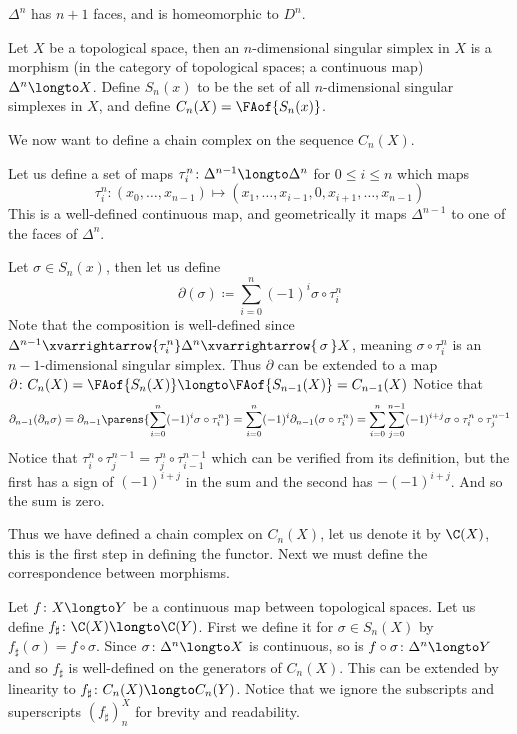 \edefn

$\Delta^n$ has $n+1$ faces, and is homeomorphic to $D^n$.

\bdefn

    Let $X$ be a topological space, then an {\emphcolor $n$-dimensional singular simplex} in $X$ is a morphism (in the category of topological spaces; a continuous map) $\Delta^n\longto X$.
    Define $S_n(x)$ to be the set of all $n$-dimensional singular simplexes in $X$, and define $C_n(X)=\FAof{S_n(x)}$.

\edefn

We now want to define a chain complex on the sequence $C_n(X)$.

Let us define a set of maps $\tau_i^n\colon\Delta^{n-1}\longto\Delta^n$ for $0\leq i\leq n$ which maps
$$ \tau_i^n\colon (x_0,\dots,x_{n-1})\mapsto(x_1,\dots,x_{i-1},0,x_{i+1},\dots,x_{n-1}) $$
This is a well-defined continuous map, and geometrically it maps $\Delta^{n-1}$ to one of the faces of $\Delta^n$.

Let $\sigma\in S_n(x)$, then let us define
$$ \partial(\sigma) \coloneqq \sum_{i=0}^n(-1)^i\sigma\circ\tau_i^n $$
Note that the composition is well-defined since $\Delta^{n-1}\xvarrightarrow{\tau_i^n}\Delta^n\xvarrightarrow{\,\sigma\,}X$, meaning $\sigma\circ\tau_i^n$ is an $n-1$-dimensional singular simplex.
Thus $\partial$ can be extended to a map $\partial\colon C_n(X)=\FAof{S_n(X)}\longto\FAof{S_{n-1}(X)}=C_{n-1}(X)$
Notice that
$$ \partial_{n-1}(\partial_n\sigma) = \partial_{n-1}\parens{\sum_{i=0}^n(-1)^i\sigma\circ\tau_i^n} = \sum_{i=0}^n(-1)^i\partial_{n-1}(\sigma\circ\tau_i^n) =
\sum_{i=0}^n\sum_{j=0}^{n-1}(-1)^{i+j}\sigma\circ\tau_i^n\circ\tau_j^{n-1} $$
Notice that $\tau^n_i\circ\tau_j^{n-1}=\tau^n_j\circ\tau^{n-1}_{i-1}$ which can be verified from its definition, but the first has a sign of $(-1)^{i+j}$ in the sum and the second has $-(-1)^{i+j}$.
And so the sum is zero.

Thus we have defined a chain complex on $C_n(X)$, let us denote it by $\C(X)$, this is the first step in defining the functor.
Next we must define the correspondence between morphisms.

Let $f\colon X\longto Y$ be a continuous map between topological spaces.
Let us define $f_\sharp\colon\C(X)\longto\C(Y)$.
First we define it for $\sigma\in S_n(X)$ by $f_\sharp(\sigma)=f\circ\sigma$.
Since $\sigma\colon\Delta^n\longto X$ is continuous, so is $f\circ\sigma\colon\Delta^n\longto Y$ and so $f_\sharp$ is well-defined on the generators of $C_n(X)$.
This can be extended by linearity to $f_\sharp\colon C_n(X)\longto C_n(Y)$.
Notice that we ignore the subscripts and superscripts $(f_\sharp)_n^X$ for brevity and readability.

